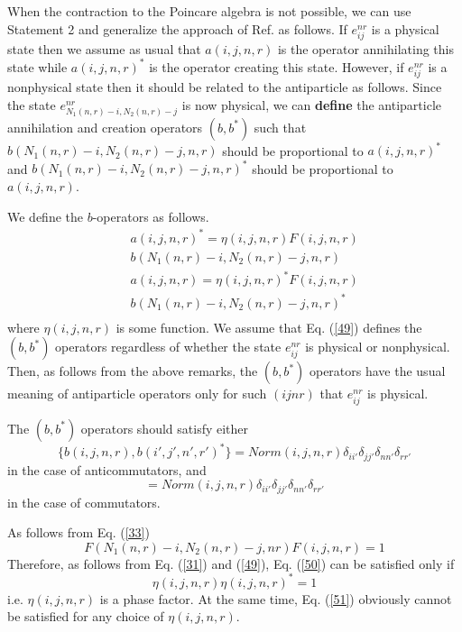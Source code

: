 \documentclass[a4paper,12pt]{article}%
\begin{document}
\begin{sloppypar}
When the contraction to the 
Poincare algebra is not possible, we can use
Statement 2 and generalize the approach of Ref.
\cite{hep} as follows. If $e^{nr}_{ij}$
is a physical state then we assume as usual that
$a(i,j,n,r)$ is the operator annihilating this
state while $a(i,j,n,r)^*$ is the operator creating
this state. However, if $e^{nr}_{ij}$
is a nonphysical state then it should be related
to the antiparticle as follows. Since the state
$e^{nr}_{N_1(n,r)-i,N_2(n,r)-j}$ is now physical,
we can {\bf define} the antiparticle annihilation
and creation operators $(b,b^*)$ such that
$b(N_1(n,r)-i,N_2(n,r)-j,n,r)$ should 
be proportional to $a(i,j,n,r)^*$ and
$b(N_1(n,r)-i,N_2(n,r)-j,n,r)^*$  
should be proportional to $a(i,j,n,r)$. 
\end{sloppypar}

We define the $b$-operators as follows. 
\begin{eqnarray}
&&a(i,j,n,r)^*=\eta(i,j,n,r) F(i,j,n,r)\nonumber\\
&&b(N_1(n,r)-i,N_2(n,r)-j,n,r)\nonumber\\ 
&&a(i,j,n,r)=\eta(i,j,n,r)^* F(i,j,n,r)\nonumber\\
&&b(N_1(n,r)-i,N_2(n,r)-j,n,r)^*\nonumber\\ 
\label{49}
\end{eqnarray}
where $\eta(i,j,n,r)$ is some function. 
We assume that Eq. (\ref{49}) defines the
$(b,b^*)$ operators regardless of whether
the state $e^{nr}_{ij}$ is physical or
nonphysical. Then, as follows from the above
remarks, the $(b,b^*)$ operators have the 
usual meaning of antiparticle operators only 
for such $(ijnr)$ that $e^{nr}_{ij}$ is physical. 

The $(b,b^*)$ operators should satisfy either
\begin{equation}
\{b(i,j,n,r),b(i',j',n',r')^*\}=Norm(i,j,n,r)
\delta_{ii'}\delta_{jj'}\delta_{nn'}\delta_{rr'}
\label{50}
\end{equation}
in the case of anticommutators, and
\begin{equation}
[b(i,j,n,r),b(i',j',n',r')^*]=Norm(i,j,n,r)
\delta_{ii'}\delta_{jj'}\delta_{nn'}\delta_{rr'}
\label{51}
\end{equation}
in the case of commutators.

As follows from Eq. (\ref{33})
\begin{equation}
F(N_1(n,r)-i,N_2(n,r)-j,nr)F(i,j,n,r)=1
\label{52}
\end{equation}
Therefore, as follows from Eq. (\ref{31}) and
(\ref{49}), Eq. (\ref{50}) can be satisfied 
only if
\begin{equation}
\eta(i,j,n,r)\eta(i,j,n,r)^*=1
\label{53}
\end{equation}
i.e. $\eta(i,j,n,r)$ is a phase factor. At the
same time, Eq. (\ref{51}) obviously cannot be satisfied
for any choice of $\eta(i,j,n,r)$.
\end{document}
